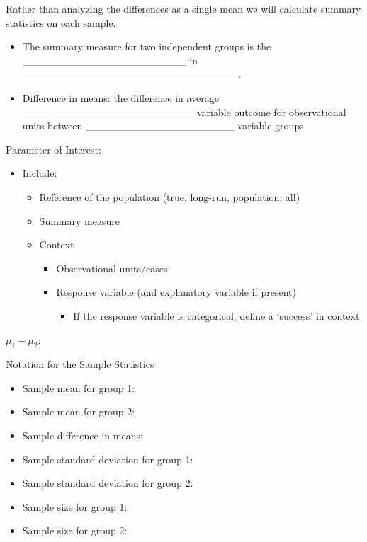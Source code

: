 \documentclass[
]{report}
\providecommand{\tightlist}{%
  \setlength{\itemsep}{0pt}\setlength{\parskip}{0pt}}
\begin{document}
Rather than analyzing the differences as a single mean we will calculate summary statistics on each sample.


\begin{itemize}
\item
  The summary measure for two independent groups is the \_\_\_\_\_\_\_\_\_\_\_\_\_\_\_\_\_\_\_\_\_\_ in \_\_\_\_\_\_\_\_\_\_\_\_\_\_\_\_\_\_\_\_\_\_\_\_\_\_\_\_\_.
\item
  Difference in means: the difference in average \_\_\_\_\_\_\_\_\_\_\_\_\_\_\_\_\_\_\_\_\_\_\_ variable outcome for observational units between \_\_\_\_\_\_\_\_\_\_\_\_\_\_\_\_\_\_\_\_ variable groups
\end{itemize}


Parameter of Interest:

\begin{itemize}
\item
  Include:

  \begin{itemize}
  \item
    Reference of the population (true, long-run, population, all)
  \item
    Summary measure
  \item
    Context

    \begin{itemize}
    \item
      Observational units/cases
    \item
      Response variable (and explanatory variable if present)

      \begin{itemize}
      \tightlist
      \item
        If the response variable is categorical, define a `success' in context
      \end{itemize}
    \end{itemize}
  \end{itemize}
\end{itemize}

\(\mu_1-\mu_2:\)

\vspace{0.5in}

\newpage


Notation for the Sample Statistics

\begin{itemize}
\item
  Sample mean for group 1:
\item
  Sample mean for group 2:
\item
  Sample difference in means:
\item
  Sample standard deviation for group 1:
\item
  Sample standard deviation for group 2:
\item
  Sample size for group 1:
\item
  Sample size for group 2:
\end{itemize}
\end{document}
